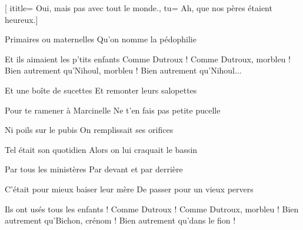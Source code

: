  [
ititle= {Oui, mais pas avec tout le monde.},
tu= {Ah, que nos pères étaient heureux.}]


\beginverse
{}
Primaires ou maternelles
Qu'on nomme la pédophilie
\endverse

\beginchorus
Et ils aimaient les p'tits enfants
Comme Dutroux !
Comme Dutroux, morbleu !
Bien autrement qu'Nihoul, morbleu !
Bien autrement qu'Nihoul...
\endchorus

\beginverse
{}
Et une boîte de sucettes
Et remonter leurs salopettes
\endverse

\beginverse
{}
Pour te ramener à Marcinelle
Ne t'en fais pas petite pucelle
\endverse

\beginverse
{}
Ni poils sur le pubis
On remplissait ses orifices
\endverse

\beginverse
{}
Tel était son quotidien
Alors on lui craquait le bassin
\endverse

\beginverse
{}
Par tous les ministères
Par devant et par derrière
\endverse

\beginverse
{}
C'était pour mieux baiser leur mère
De passer pour un vieux pervers
\endverse

\beginchorus
Ils ont usés tous les enfants !
Comme Dutroux !
Comme Dutroux, morbleu !
Bien autrement qu'Bichon, crénom !
Bien autrement qu'dans le fion !
\endchorus

\endsong